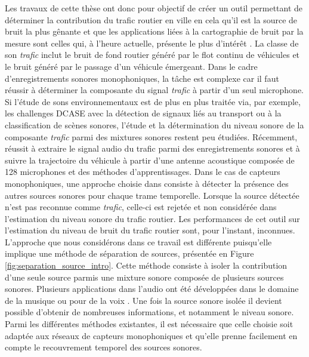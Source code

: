 Les travaux de cette thèse ont donc pour objectif de créer un outil permettant de déterminer la contribution du trafic routier en ville en cela qu'il est la source de bruit la plus gênante et que les applications liées à la cartographie de bruit par la mesure sont celles qui, à l'heure actuelle, présente le plus d'intérêt \cite{jagniatinskis2014assessment}. La classe de son \textit{trafic} inclut le bruit de fond routier généré par le flot continu de véhicules et le bruit généré par le passage d'un véhicule émergeant.
Dans le cadre d'enregistrements sonores monophoniques, la tâche est complexe car il faut réussir à déterminer la composante du signal \textit{trafic} à partir d'un seul microphone. Si l'étude de sons environnementaux est de plus en plus traitée via, par exemple, les challenges DCASE \cite{stowell2015detection,mesaros2017dcase} avec la détection de signaux liés au transport ou à la classification de scènes sonores, l'étude et la détermination du niveau sonore de la composante \textit{trafic} parmi des mixtures sonores restent peu étudiées. Récemment, \cite{leiba2017large} réussit à extraire le signal audio du trafic parmi des enregistrements sonores et à suivre la trajectoire du véhicule à partir d'une antenne acoustique composée de 128 microphones et des méthodes d'apprentissages.
Dans le cas de capteurs monophoniques, une approche choisie dans \cite{socoro2017anomalous} consiste à détecter la présence des autres sources sonores pour chaque trame temporelle. Lorsque la source détectée n'est pas reconnue comme \textit{trafic}, celle-ci est rejetée et non considérée dans l'estimation du niveau sonore du trafic routier. Les performances de cet outil sur l'estimation du niveau de bruit du trafic routier sont, pour l'instant, inconnues.
L'approche que nous considérons dans ce travail est différente puisqu'elle implique une méthode de séparation de sources, présentée en Figure \ref{fig:separation_source_intro}. Cette méthode consiste à isoler la contribution d'une seule source parmis une mixture sonore composée de plusieurs sources sonores. Plusieurs applications dans l'audio ont été développées dans le domaine de la musique \cite{smaragdis_non-negative_2003,virtanen_monaural_2007} ou pour de la voix \cite{weninger2012supervised,yilmaz2004blind}. Une fois la source sonore isolée il devient possible d'obtenir de nombreuses informations, et notamment le niveau sonore. Parmi les différentes méthodes existantes, il est nécessaire que celle choisie soit adaptée aux réseaux de capteurs monophoniques et qu'elle prenne facilement en compte le recouvrement temporel des sources sonores. 

